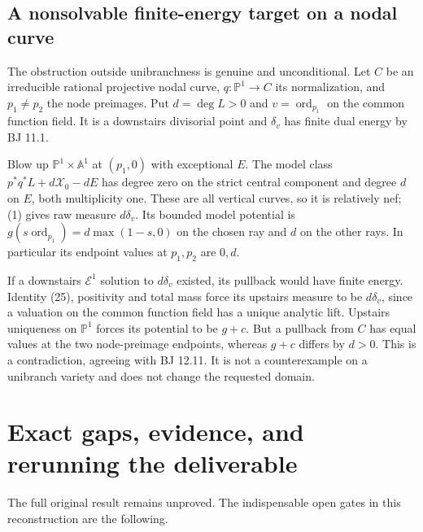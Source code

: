 \documentclass[
  11pt,
]{article}
\begin{document}
\subsection{A nonsolvable finite-energy target on a nodal
curve}\label{a-nonsolvable-finite-energy-target-on-a-nodal-curve}

The obstruction outside unibranchness is genuine and unconditional. Let
\(C\) be an irreducible rational projective nodal curve,
\(q:\mathbb P^1\to C\) its normalization, and \(p_1\ne p_2\) the node
preimages. Put \(d=\deg L>0\) and \(v=\operatorname{ord}_{p_1}\) on the
common function field. It is a downstairs divisorial point and
\(\delta_v\) has finite dual energy by BJ 11.1.

Blow up \(\mathbb P^1\times\mathbb A^1\) at \((p_1,0)\) with exceptional
\(E\). The model class \(p^*q^*L+d\mathcal X_0-dE\) has degree zero on
the strict central component and degree \(d\) on \(E\), both
multiplicity one. These are all vertical curves, so it is relatively
nef; (1) gives raw measure \(d\delta_v\). Its bounded model potential is
\(g(s\operatorname{ord}_{p_1})=d\max(1-s,0)\) on the chosen ray and
\(d\) on the other rays. In particular its endpoint values at
\(p_1,p_2\) are \(0,d\).

If a downstairs \(\mathcal E^1\) solution to \(d\delta_v\) existed, its
pullback would have finite energy. Identity (25), positivity and total
mass force its upstairs measure to be \(d\delta_v\), since a valuation
on the common function field has a unique analytic lift. Upstairs
uniqueness on \(\mathbb P^1\) forces its potential to be \(g+c\). But a
pullback from \(C\) has equal values at the two node-preimage endpoints,
whereas \(g+c\) differs by \(d>0\). This is a contradiction, agreeing
with BJ 12.11. It is not a counterexample on a unibranch variety and
does not change the requested domain.

\section{Exact gaps, evidence, and rerunning the
deliverable}\label{exact-gaps-evidence-and-rerunning-the-deliverable}

The full original result remains unproved. The indispensable open gates
in this reconstruction are the following.
\end{document}

